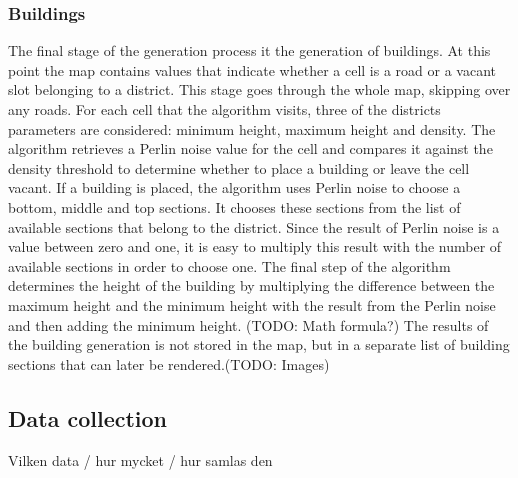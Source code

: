 		\subsubsection{Buildings}
		The final stage of the generation process it the generation of buildings. At this point the map contains values that indicate whether a cell is a road or a vacant slot belonging to a district. This stage goes through the whole map, skipping over any roads. For each cell that the algorithm visits, three of the districts parameters are considered: minimum height, maximum height and density. The algorithm retrieves a Perlin noise value for the cell and compares it against the density threshold to determine whether to place a building or leave the cell vacant. If a building is placed, the algorithm uses Perlin noise to choose a bottom, middle and top sections. It chooses these sections from the list of available sections that belong to the district. Since the result of Perlin noise is a value between zero and one, it is easy to multiply this result with the number of available sections in order to choose one. The final step of the algorithm determines the height of the building by multiplying the difference between the maximum height and the minimum height with the result from the Perlin noise and then adding the minimum height. (TODO: Math formula?) The results of the building generation is not stored in the map, but in a separate list of building sections that can later be rendered.(TODO: Images)

	\subsection{Data collection}
	Vilken data / hur mycket / hur samlas den